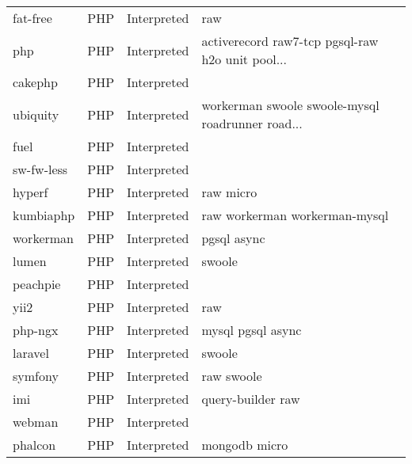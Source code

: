 \begin{longtable}{llll}
    fat-free         & PHP & Interpreted         & raw                                                \\
    php              & PHP & Interpreted         & activerecord raw7-tcp pgsql-raw h2o unit pool...   \\
    cakephp          & PHP & Interpreted         &                                                    \\
    ubiquity         & PHP & Interpreted         & workerman swoole swoole-mysql roadrunner road...   \\
    fuel             & PHP & Interpreted         &                                                    \\
    sw-fw-less       & PHP & Interpreted         &                                                    \\
    hyperf           & PHP & Interpreted         & raw micro                                          \\
    kumbiaphp        & PHP & Interpreted         & raw workerman workerman-mysql                      \\
    workerman        & PHP & Interpreted         & pgsql async                                        \\
    lumen            & PHP & Interpreted         & swoole                                             \\
    peachpie         & PHP & Interpreted         &                                                    \\
    yii2             & PHP & Interpreted         & raw                                                \\
    php-ngx          & PHP & Interpreted         & mysql pgsql async                                  \\
    laravel          & PHP & Interpreted         & swoole                                             \\
    symfony          & PHP & Interpreted         & raw swoole                                         \\
    imi              & PHP & Interpreted         & query-builder raw                                  \\
    webman           & PHP & Interpreted         &                                                    \\
    phalcon          & PHP & Interpreted         & mongodb micro                                      \\

\end{longtable}

